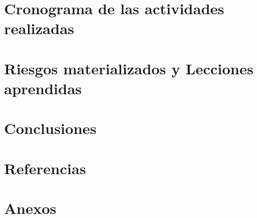\documentclass[11pt]{article}
\begin{document}


\section{Cronograma de las actividades realizadas}



\section{Riesgos materializados y Lecciones aprendidas}



\section{Conclusiones}



\section{Referencias}



\section{Anexos}


\end{document}
